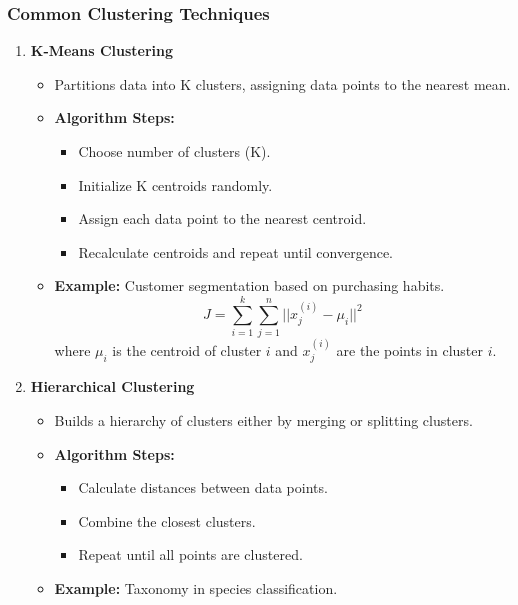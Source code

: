 \documentclass[aspectratio=169]{beamer}
\begin{document}
\begin{frame}[fragile]
    \frametitle{Common Clustering Techniques}
    \begin{enumerate}
        \item \textbf{K-Means Clustering}
        \begin{itemize}
            \item Partitions data into K clusters, assigning data points to the nearest mean.
            \item \textbf{Algorithm Steps:}
            \begin{itemize}
                \item Choose number of clusters (K).
                \item Initialize K centroids randomly.
                \item Assign each data point to the nearest centroid.
                \item Recalculate centroids and repeat until convergence.
            \end{itemize}
            \item \textbf{Example:} Customer segmentation based on purchasing habits.
            \begin{equation}
            J = \sum_{i=1}^{k} \sum_{j=1}^{n} ||x_j^{(i)} - \mu_i||^2
            \end{equation}
            where \( \mu_i \) is the centroid of cluster \( i \) and \( x_j^{(i)} \) are the points in cluster \( i \).
        \end{itemize}
        
        \item \textbf{Hierarchical Clustering}
        \begin{itemize}
            \item Builds a hierarchy of clusters either by merging or splitting clusters.
            \item \textbf{Algorithm Steps:}
            \begin{itemize}
                \item Calculate distances between data points.
                \item Combine the closest clusters.
                \item Repeat until all points are clustered.
            \end{itemize}
            \item \textbf{Example:} Taxonomy in species classification.
        \end{itemize}
        

\end{enumerate}
\end{frame}
\end{document}
